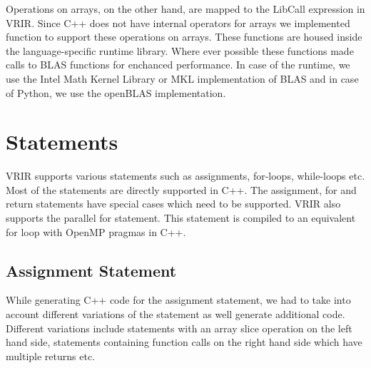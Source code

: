 					Operations on arrays, on the other hand, are mapped to the LibCall expression in VRIR. Since C++ does not have internal operators for arrays we implemented function to support these operations on arrays. These functions are housed inside the language-specific runtime library. Where ever possible these functions made calls to BLAS functions for enchanced performance. In case of the \matlab\cite{matlab} runtime, we use the Intel Math Kernel Library\cite{mkl} or MKL implementation of BLAS and in case of Python\cite{python}, we use the openBLAS\cite{openblas} implementation.
\section{Statements}
VRIR supports various statements such as assignments, for-loops, while-loops etc. Most of the statements are directly supported in C++. The assignment, for and return statements have special cases which need to be supported. VRIR also supports the parallel for statement. This statement is compiled to an equivalent for loop with OpenMP pragmas in C++.
\subsection{Assignment Statement}
While generating C++ code for the assignment statement, we had to take into account different variations of the statement as well generate additional code. Different variations include statements with an array slice operation on the left hand side, statements containing function calls on the right hand side which have multiple returns etc. 
